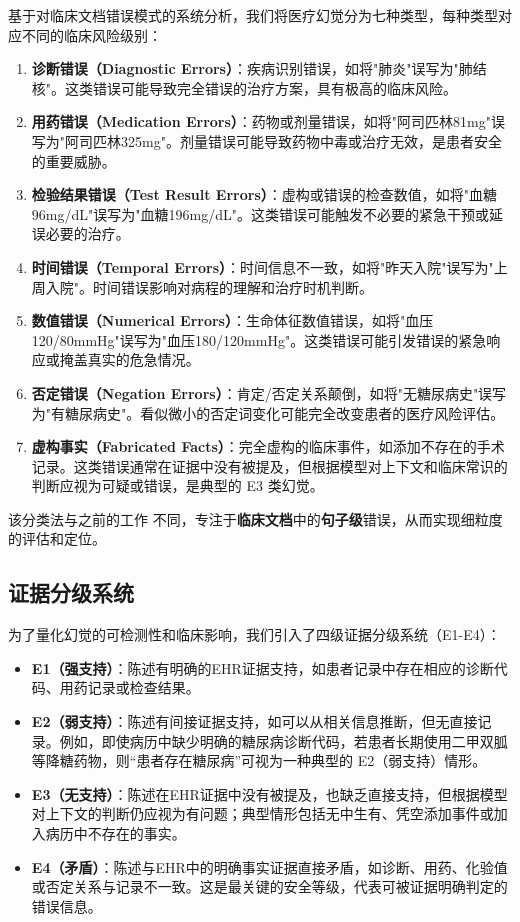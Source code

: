 \documentclass[11pt]{article}
\begin{document}
基于对临床文档错误模式的系统分析，我们将医疗幻觉分为七种类型，每种类型对应不同的临床风险级别：

\begin{enumerate}
\def\labelenumi{\arabic{enumi}.}
\item
  \textbf{诊断错误（Diagnostic Errors）}：疾病识别错误，如将"肺炎"误写为"肺结核"。这类错误可能导致完全错误的治疗方案，具有极高的临床风险。
\item
  \textbf{用药错误（Medication Errors）}：药物或剂量错误，如将"阿司匹林81mg"误写为"阿司匹林325mg"。剂量错误可能导致药物中毒或治疗无效，是患者安全的重要威胁。
\item
  \textbf{检验结果错误（Test Result Errors）}：虚构或错误的检查数值，如将"血糖96mg/dL"误写为"血糖196mg/dL"。这类错误可能触发不必要的紧急干预或延误必要的治疗。
\item
  \textbf{时间错误（Temporal Errors）}：时间信息不一致，如将"昨天入院"误写为"上周入院"。时间错误影响对病程的理解和治疗时机判断。
\item
  \textbf{数值错误（Numerical Errors）}：生命体征数值错误，如将"血压120/80mmHg"误写为"血压180/120mmHg"。这类错误可能引发错误的紧急响应或掩盖真实的危急情况。
\item
  \textbf{否定错误（Negation Errors）}：肯定/否定关系颠倒，如将"无糖尿病史"误写为"有糖尿病史"。看似微小的否定词变化可能完全改变患者的医疗风险评估。
\item
  \textbf{虚构事实（Fabricated Facts）}：完全虚构的临床事件，如添加不存在的手术记录。这类错误通常在证据中没有被提及，但根据模型对上下文和临床常识的判断应视为可疑或错误，是典型的 E3 类幻觉。
\end{enumerate}

该分类法与之前的工作 \citep{rotmensch2017healthKnowledgeGraph,ji2023hallucinationSurvey}不同，专注于\textbf{临床文档}中的\textbf{句子级}错误，从而实现细粒度的评估和定位。

\subsection{证据分级系统}

为了量化幻觉的可检测性和临床影响，我们引入了四级证据分级系统（E1-E4）：

\begin{itemize}
\item
  \textbf{E1（强支持）}：陈述有明确的EHR证据支持，如患者记录中存在相应的诊断代码、用药记录或检查结果。
\item
  \textbf{E2（弱支持）}：陈述有间接证据支持，如可以从相关信息推断，但无直接记录。例如，即使病历中缺少明确的糖尿病诊断代码，若患者长期使用二甲双胍等降糖药物，则``患者存在糖尿病''可视为一种典型的 E2（弱支持）情形。
\item
  \textbf{E3（无支持）}：陈述在EHR证据中没有被提及，也缺乏直接支持，但根据模型对上下文的判断仍应视为有问题；典型情形包括无中生有、凭空添加事件或加入病历中不存在的事实。
\item
  \textbf{E4（矛盾）}：陈述与EHR中的明确事实证据直接矛盾，如诊断、用药、化验值或否定关系与记录不一致。这是最关键的安全等级，代表可被证据明确判定的错误信息。
\end{itemize}
\end{document}
